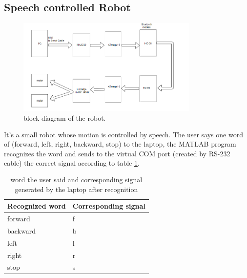 \documentclass[12pt, a4paper, twoside]{report}
\begin{document}
\subsection{Speech controlled Robot}
\begin{figure}[!h]
	\centering
	\includegraphics[width=0.8\textwidth]
	{images/chapter6/hardware-4}
	\caption{block diagram of the robot.}
	\label{fig:hardware-4}
\end{figure}

It's a small robot whose motion is controlled by speech. The user says one word of (forward, left, right, backward, stop) to the laptop, the MATLAB program recognizes the word and sends to the virtual COM port (created by RS-232 cable) the correct signal according to table \ref{tab:words-robot}.
\begin{table}[!h]
\centering
\begin{tabular}{|l|l|}
\hline
\textbf{Recognized word} & \textbf{Corresponding signal} \\ \hline
forward                  & f                             \\ \hline
backward                 & b                             \\ \hline
left                     & l                             \\ \hline
right                    & r                             \\ \hline
stop                     & s                             \\ \hline
\end{tabular}
\caption{word the user said and corresponding signal generated 
by the laptop after recognition}
\label{tab:words-robot}
\end{table}
\end{document}
